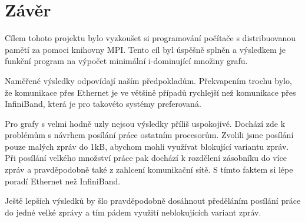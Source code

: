 \documentclass[12pt]{article}
\begin{document}
\section{Závěr}
Cílem tohoto projektu bylo vyzkoušet si programování počítače s distribuovanou pamětí za pomoci knihovny MPI. Tento cíl byl úspěšně splněn a výsledkem je funkční program na výpočet minimální i-dominující množiny grafu.

Naměřené výsledky odpovídají naším předpokladům. Překvapením trochu bylo, že komunikace přes Ethernet je ve většině případů rychlejší než komunikace přes InfiniBand, která je pro takovéto systémy preferovaná.

Pro grafy s velmi hodně uzly nejsou výsledky příliš uspokojivé. Dochází zde k problémům s návrhem posílání práce ostatním procesorům. Zvolili jsme posílání pouze malých zpráv do 1kB, abychom mohli využívat blokující variantu zpráv. Při posílání velkého množství práce pak dochází k rozdělení zásobníku do více zpráv a pravděpodobně také z zahlcení komunikační sítě. S tímto faktem si lépe poradí Ethernet než InfiniBand.

Ještě lepších výsledků by šlo pravděpodobně dosáhnout předěláním posílání práce do jedné velké zprávy a tím pádem využití neblokujících variant zpráv.   
\end{document}
